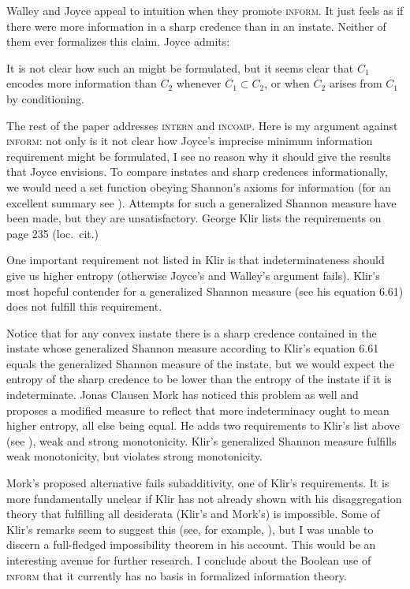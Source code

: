 \documentclass[11pt]{article}
\begin{document}
Walley and Joyce appeal to intuition when they promote
\textsc{inform}. It just feels as if there were more information in a
sharp credence than in an instate. Neither of them ever formalizes
this claim. Joyce admits:

\begin{quotex}
  It is not clear how such an  might be formulated, but it seems clear that $C_{1}$
  encodes more information than $C_{2}$ whenever
  $C_{1}\subset{}C_{2}$, or when $C_{2}$ arises from $C_{1}$ by
  conditioning. 
\end{quotex}


The rest of the paper addresses \textsc{intern} and \textsc{incomp}.
Here is my argument against \textsc{inform}: not only is it not clear
how Joyce's imprecise minimum information requirement might be
formulated, I see no reason why it should give the results that Joyce
envisions. To compare instates and sharp credences informationally, we
would need a set function obeying Shannon's axioms for information
(for an excellent summary see ). Attempts for such
a generalized Shannon measure have been made, but they are
unsatisfactory. George Klir lists the requirements on page 235 (loc.\
cit.)

One important requirement not listed in Klir is that indeterminateness
should give us higher entropy (otherwise Joyce's and Walley's argument
fails). Klir's most hopeful contender for a generalized
Shannon measure (see his equation 6.61) does not fulfill this
requirement.

Notice that for any convex instate there is a sharp credence contained
in the instate whose generalized Shannon measure according to Klir's
equation 6.61 equals the generalized Shannon measure of the instate,
but we would expect the entropy of the sharp credence to be lower than
the entropy of the instate if it is indeterminate. Jonas Clausen Mork
has noticed this problem as well and proposes a modified measure to
reflect that more indeterminacy ought to mean higher entropy, all else
being equal. He adds two requirements to Klir's list above (see
), weak and strong monotonicity. Klir's
generalized Shannon measure fulfills weak monotonicity, but violates
strong monotonicity. 

Mork's proposed alternative fails subadditivity, one of Klir's
requirements. It is more fundamentally unclear if Klir has not already
shown with his disaggregation theory that fulfilling all desiderata
(Klir's and Mork's) is impossible. Some of Klir's remarks seem to
suggest this (see, for example, \scite{8}{klir06}{218}), but I was
unable to discern a full-fledged impossibility theorem in his account.
This would be an interesting avenue for further research. I conclude
about the Boolean use of \textsc{inform} that it currently has no
basis in formalized information theory.
\end{document}
